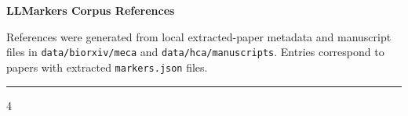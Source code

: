 \documentclass[final]{article}
\newcommand{\TitleFont}{\fontsize{40}{46}\selectfont}
\newcommand{\MetaFont}{\fontsize{12}{15}\selectfont}
\newcommand{\RefFont}{\fontsize{6.4}{7.5}\selectfont}
\begin{document}
{\TitleFont\bfseries\color{berkeleyblue}LLMarkers Corpus References\par}
\vspace{0.08in}
{\MetaFont\color{mutedgray}
References were generated from local extracted-paper metadata and manuscript files in
\texttt{data/biorxiv/meca} and \texttt{data/hca/manuscripts}. Entries correspond to papers
with extracted \texttt{markers.json} files.\par}
\vspace{0.08in}
{\color{rulegray}\rule{\linewidth}{1.2pt}}
\vspace{0.08in}

{\RefFont
\begin{multicols}{4}

\end{multicols}
}
\end{document}
